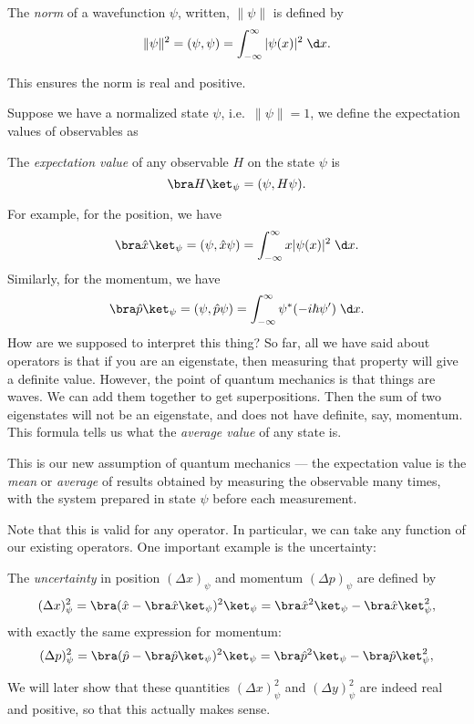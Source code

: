 \documentclass[a4paper]{article}
\begin{document}
\begin{defi}[Norm]
  The \emph{norm} of a wavefunction $\psi$, written, $\|\psi\|$ is defined by
  \[
    \|\psi\|^2 = (\psi, \psi) = \int_{-\infty}^\infty |\psi(x)|^2\;\d x.
  \]
\end{defi}
This ensures the norm is real and positive.

Suppose we have a normalized state $\psi$, i.e.\ $\|\psi\| = 1$, we define the expectation values of observables as
\begin{defi}
  The \emph{expectation value} of any observable $H$ on the state $\psi$ is
  \[
    \bra H \ket_\psi = (\psi, H\psi).
  \]
\end{defi}
For example, for the position, we have
\[
  \bra \hat{x} \ket_\psi = (\psi, \hat{x}\psi) = \int_{-\infty}^\infty x|\psi(x)|^2 \;\d x.
\]
Similarly, for the momentum, we have
\[
  \bra \hat{p} \ket_{\psi} = (\psi, \hat{p}\psi) = \int_{-\infty}^\infty \psi^* (-i\hbar \psi')\;\d x.
\]
How are we supposed to interpret this thing? So far, all we have said about operators is that if you are an eigenstate, then measuring that property will give a definite value. However, the point of quantum mechanics is that things are waves. We can add them together to get superpositions. Then the sum of two eigenstates will not be an eigenstate, and does not have definite, say, momentum. This formula tells us what the \emph{average value} of any state is.

This is our new assumption of quantum mechanics --- the expectation value is the \emph{mean} or \emph{average} of results obtained by measuring the observable many times, with the system prepared in state $\psi$ before each measurement.

Note that this is valid for any operator. In particular, we can take any function of our existing operators. One important example is the uncertainty:
\begin{defi}[Uncertainty]
  The \emph{uncertainty} in position $(\Delta x)_\psi$ and momentum $(\Delta p)_\psi$ are defined by
  \[
    (\Delta x)_\psi^2 = \bra (\hat{x} - \bra \hat{x}\ket_\psi)^2 \ket_\psi = \bra \hat{x}^2\ket_\psi - \bra \hat{x}\ket^2_\psi,
  \]
  with exactly the same expression for momentum:
  \[
    (\Delta p)_\psi^2 = \bra (\hat{p} - \bra \hat{p}\ket_\psi)^2 \ket_\psi = \bra \hat{p}^2\ket_\psi - \bra \hat{p}\ket^2_\psi,
  \]
\end{defi}
We will later show that these quantities $(\Delta x)_\psi^2$ and $(\Delta y)_\psi^2$ are indeed real and positive, so that this actually makes sense.
\end{document}
